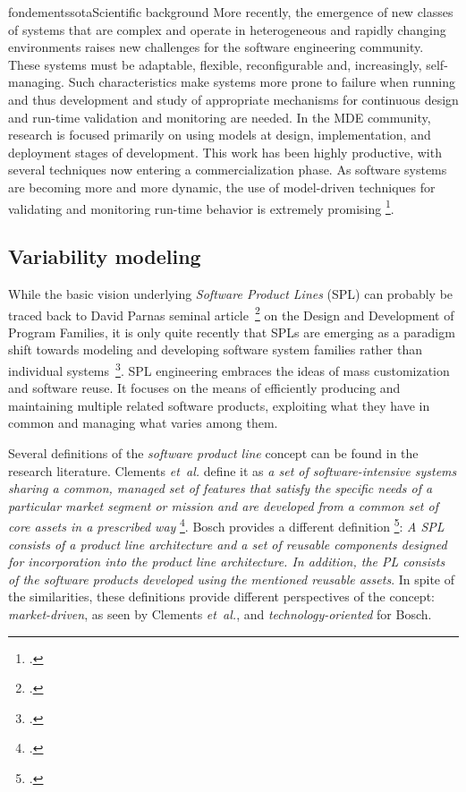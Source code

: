 \documentclass{ra2018}
\begin{document}
\begin{module}{fondements}{sota}{Scientific background}
More recently, the emergence of new classes of systems that are complex and  operate in heterogeneous and rapidly changing environments raises new challenges for the software engineering community. These systems must be adaptable, flexible, reconfigurable and, increasingly, self-managing. Such characteristics make systems more prone to failure when running and thus development and study of appropriate mechanisms for continuous design and run-time validation and monitoring are needed. In the MDE community, research is focused primarily on using models at design, implementation, and deployment stages of development. This work has been highly productive, with several techniques now entering a commercialization phase. As software systems are becoming more and more dynamic, the use of model-driven techniques for validating and monitoring run-time behavior
is extremely promising   \footcite{Morin09f}.



\subsection{Variability modeling}
\label{sec:variability}
While the basic vision underlying \textit{Software Product Lines} (SPL) can
probably be traced back to David Parnas seminal article~\footcite{parnas1976} on
the Design and Development of Program Families, it is only quite recently that
SPLs are emerging as a paradigm shift towards modeling and developing
software system families rather than individual
systems~\footcite{Northrop1999}. SPL engineering embraces the ideas of mass
customization and software reuse. It focuses on the means of efficiently
producing and maintaining multiple related software products, exploiting what
they have in common and managing what varies among them.

Several definitions of the \emph{software product line} concept can be found
in the research literature. Clements \textit{et~al.} define it as \textit{a set of
software-intensive systems sharing a common, managed set of features that
satisfy the specific needs of a particular market segment or mission and are
developed from a common set of core assets in a prescribed way}
  \footcite{Northrop2002}. Bosch provides a different definition   \footcite{Bosch2000}:
\textit{A SPL consists of a product line architecture and a set of reusable
components designed for incorporation into the product line architecture. In
addition, the PL consists of the software products developed using the
mentioned reusable assets}. In spite of the similarities, these definitions
provide different perspectives of the concept: \textit{market-driven}, as seen
by Clements \textit{et~al.}, and \textit{technology-oriented} for Bosch.


\end{module}
\end{document}
